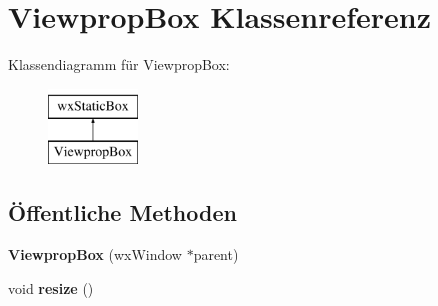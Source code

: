\hypertarget{classViewpropBox}{\section{Viewprop\-Box Klassenreferenz}
\label{classViewpropBox}
}
Klassendiagramm für Viewprop\-Box\-:\begin{figure}[H]
\begin{center}
\leavevmode
\includegraphics[height=2.000000cm]{classViewpropBox}
\end{center}
\end{figure}
\subsection*{Öffentliche Methoden}
\begin{DoxyCompactItemize}
\item 
\hypertarget{classViewpropBox_a4cac75d99079134622f57e35f1e47229}{{\bfseries Viewprop\-Box} (wx\-Window $\ast$parent)}\label{classViewpropBox_a4cac75d99079134622f57e35f1e47229}

\item 
\hypertarget{classViewpropBox_a7f2732c6e7d24fc90fad55972cb1e759}{void {\bfseries resize} ()}\label{classViewpropBox_a7f2732c6e7d24fc90fad55972cb1e759}

\end{DoxyCompactItemize}
